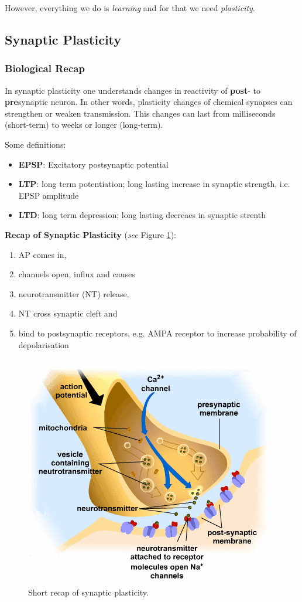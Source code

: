 \documentclass[main]{subfiles}
\begin{document}
However, everything we do is \textit{learning} and for that we need \textit{plasticity}.

\subsection{Synaptic Plasticity}

\subsubsection{Biological Recap}
In synaptic plasticity one understands changes in reactivity of \textbf{post}- to \textbf{pre}synaptic neuron. In other words, plasticity changes of chemical synapses can strengthen or weaken transmission. This changes can last from milliseconds (short-term) to weeks or longer (long-term).

Some definitions:
\begin{itemize}
    \item \textbf{EPSP}: Excitatory postsynaptic potential
    \item \textbf{LTP}: long term potentiation; long lasting increase in synaptic strength, i.e. EPSP amplitude
    \item \textbf{LTD}: long term depression; long lasting decreaes in synaptic strenth
\end{itemize}

\textbf{Recap of Synaptic Plasticity} (\textit{see} Figure \ref{fig:syn_plast}):
\begin{enumerate}
    \item AP comes in,
    \item {} channels open,  influx and causes
    \item neurotransmitter (NT) release.
    \item NT cross synaptic cleft and
    \item bind to postsynaptic receptors, e.g. AMPA receptor to increase probability of depolarisation
\end{enumerate}

\begin{figure}[H]
    \centering
    \includegraphics[width=.7\textwidth]{03_PlasticityInTheBrain/figures/synaptic_plasticity.jpg}
    \caption{Short recap of synaptic plasticity.}
    \label{fig:syn_plast}
\end{figure}
\end{document}
